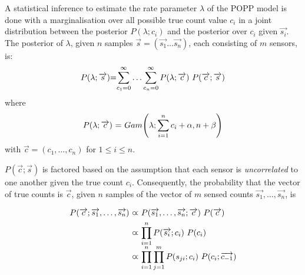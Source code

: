A statistical inference to estimate the rate parameter $\lambda$ of the POPP model is done with a marginalisation over all possible true count value $c_i$ in a joint distribution between the posterior $P(\lambda ; c_i)$ and the posterior over $c_i$ given $\overrightarrow{s_i}$. The posterior of $\lambda$, given $n$ samples $\overrightarrow{s}=(\overrightarrow{s_1} \dots \overrightarrow{s_n})$, each consisting of $m$ sensors, is:
\begin{equation}
	\label{eq:marginal_occurrences}
	\begin{tabular}{r@{=}l}
		$P(\lambda ; \overrightarrow{s})$ &  $\displaystyle\sum_{c_1=0}^{\infty} \ldots \displaystyle\sum_{c_n=0}^{\infty} P(\lambda ; \overrightarrow{c}) ~ P(\overrightarrow{c} ; \overrightarrow{s})$ \\
	\end{tabular}
\end{equation}
\noindent where
\begin{equation*}
	\begin{tabular}{r@{ = }l}
		$P(\lambda ; \overrightarrow{c})$ & $Gam\Bigg(\lambda ; \displaystyle\sum_{i=1}^{n} c_i + \alpha, n + \beta \Bigg)$
	\end{tabular}
\end{equation*}
\noindent with $\overrightarrow{c} = (c_1, \ldots, c_n)$ for $1 \leq i \leq n$.

$P(\overrightarrow{c} ; \overrightarrow{s})$ is factored based on the assumption that each sensor is \textit{uncorrelated} to one another given the true count $c_i$. Consequently, the probability that the vector of true counts is $\overrightarrow{c}$, given $n$ samples of the vector of $m$ sensed counts $\overrightarrow{s_1}, \ldots, \overrightarrow{s_n}$, is

\begin{equation}
    \label{eq:occurrences_likelihood}
    \begin{tabular}{r@{ $\varpropto$ }l}
        $P(\overrightarrow{c} ; \overrightarrow{s_1}, \ldots, \overrightarrow{s_n})$ & $P(\overrightarrow{s_1}, \ldots, \overrightarrow{s_n} ; \overrightarrow{c}) ~ P(\overrightarrow{c})$ \\ [1ex]
        & $\displaystyle\prod_{i=1}^{n} P(\overrightarrow{s_i} ; c_i) ~ P(c_i)$ \\ [2ex]
        & $\displaystyle\prod_{i=1}^{n} \displaystyle\prod_{j=1}^{m} P(s_{ji} ; c_i) ~ P(c_i ; \overrightarrow{c_{-1}})$
    \end{tabular}
\end{equation}

